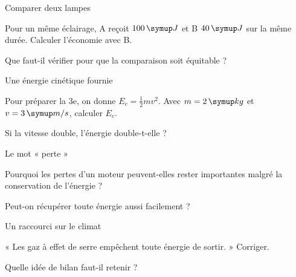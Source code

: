 \clearpage{}
\par\noindent\begin{minipage}{\linewidth}
\begin{exercice}[3]{Comparer deux lampes}
\begin{questions}
\item Pour un même éclairage, A reçoit $100\unite J$ et B $40\unite J$ sur la même durée. Calculer l’économie avec B.
\item Que faut-il vérifier pour que la comparaison soit équitable ?
\end{questions}
\end{exercice}
\end{minipage}
\par\noindent\begin{minipage}{\linewidth}
\begin{exercice}[3]{Une énergie cinétique fournie}
\begin{questions}
\item Pour préparer la 3e, on donne $E_c=\frac12mv^2$. Avec $m=2\unite{kg}$ et $v=3\unite{m/s}$, calculer $E_c$.
\item Si la vitesse double, l’énergie double-t-elle ?
\end{questions}
\end{exercice}
\end{minipage}
\par\noindent\begin{minipage}{\linewidth}
\begin{exercice}[3]{Le mot « perte »}
\begin{questions}
\item Pourquoi les pertes d’un moteur peuvent-elles rester importantes malgré la conservation de l’énergie ?
\item Peut-on récupérer toute énergie aussi facilement ?
\end{questions}
\end{exercice}
\end{minipage}
\par\noindent\begin{minipage}{\linewidth}
\begin{exercice}[3]{Un raccourci sur le climat}
\begin{questions}
\item « Les gaz à effet de serre empêchent toute énergie de sortir. » Corriger.
\item Quelle idée de bilan faut-il retenir ?
\end{questions}
\end{exercice}
\end{minipage}

